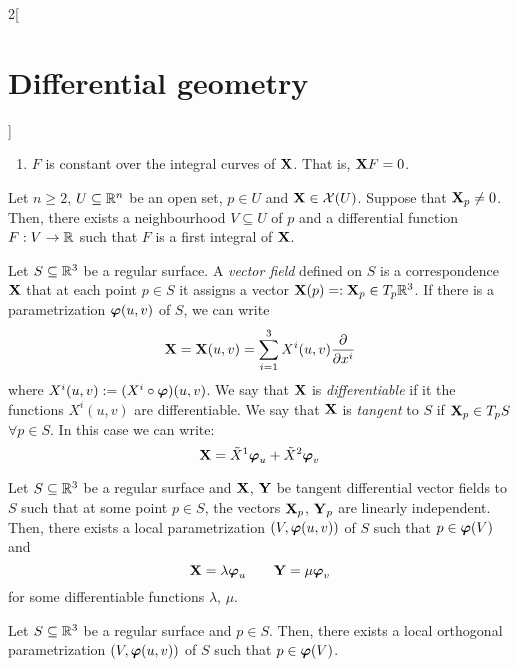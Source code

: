 \documentclass[../../../main_math.tex]{subfiles}
\begin{document}
\begin{multicols}{2}[\section{Differential geometry}]
\begin{proposition}
\begin{enumerate}
      \item $F$ is constant over the integral curves of $\boldsymbol{\mathrm{X}}$. That is, $\boldsymbol{\mathrm{X}}F=0$.
    \end{enumerate}
  \end{proposition}
  \begin{proposition}
    Let $n\geq 2$, $U\subseteq\mathbb{R}^n$ be an open set, $p\in U$ and $\boldsymbol{\mathrm{X}}\in\mathcal{X}(U)$. Suppose that $\boldsymbol{\mathrm{X}}_p\ne 0$. Then, there exists a neighbourhood $V\subseteq U$ of $p$ and a differential function $F:V\rightarrow\mathbb{R}$ such that $F$ is a first integral of $\boldsymbol{\mathrm{X}}$.
  \end{proposition}
  \begin{definition}
    Let $S\subseteq\mathbb{R}^3$ be a regular surface. A \emph{vector field} defined on $S$ is a correspondence $\boldsymbol{\mathrm{X}}$ that at each point $p\in S$ it assigns a vector $\boldsymbol{\mathrm{X}}(p)=:\boldsymbol{\mathrm{X}}_p\in T_p\mathbb{R}^3$. If there is a parametrization $\boldsymbol{\mathrm{\varphi}}(u,v)$ of $S$, we can write
    $$\boldsymbol{\mathrm{X}}=\boldsymbol{\mathrm{X}}(u,v)=\sum_{i=1}^3X^i(u,v)\pdv{}{x^i}$$
    where $X^i(u,v):=(X^i\circ\boldsymbol{\mathrm{\varphi}})(u,v)$. We say that $\boldsymbol{\mathrm{X}}$ is \emph{differentiable} if it the functions $X^i(u,v)$ are differentiable. We say that $\boldsymbol{\mathrm{X}}$ is \emph{tangent} to $S$ if $\boldsymbol{\mathrm{X}}_p\in T_pS$ $\forall p\in S$. In this case we can write: $$\boldsymbol{\mathrm{X}}=\tilde{X}^1\boldsymbol{\mathrm{\varphi}}_u+\tilde{X}^2\boldsymbol{\mathrm{\varphi}}_v$$
  \end{definition}
  \begin{proposition}
    Let $S\subseteq\mathbb{R}^3$ be a regular surface and $\boldsymbol{\mathrm{X}}$, $\boldsymbol{\mathrm{Y}}$ be tangent differential vector fields to $S$ such that at some point $p\in S$, the vectors $\boldsymbol{\mathrm{X}}_p$, $\boldsymbol{\mathrm{Y}}_p$ are linearly independent. Then, there exists a local parametrization $(V,\boldsymbol{\mathrm{\varphi}}(u,v))$ of $S$ such that $p\in\boldsymbol{\mathrm{\varphi}}(V)$ and $$\boldsymbol{\mathrm{X}}=\lambda\boldsymbol{\mathrm{\varphi}}_u\qquad\boldsymbol{\mathrm{Y}}=\mu\boldsymbol{\mathrm{\varphi}}_v$$ for some differentiable functions $\lambda$, $\mu$.
  \end{proposition}
  \begin{corollary}
    Let $S\subseteq\mathbb{R}^3$ be a regular surface and $p\in S$. Then, there exists a local orthogonal parametrization $(V,\boldsymbol{\mathrm{\varphi}}(u,v))$ of $S$ such that $p\in\boldsymbol{\mathrm{\varphi}}(V)$.
  \end{corollary}

\end{multicols}
\end{document}
